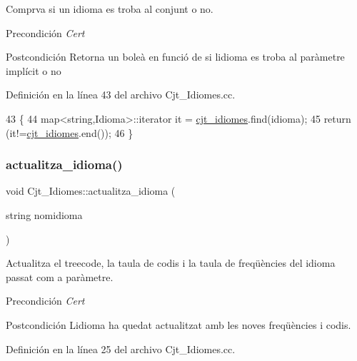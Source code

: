 Comprva si un idioma es troba al conjunt o no. 

\begin{DoxyPrecond}{Precondición}
{\itshape Cert} 
\end{DoxyPrecond}
\begin{DoxyPostcond}{Postcondición}
Retorna un boleà en funció de si l\textquotesingle{}idioma es troba al paràmetre implícit o no 
\end{DoxyPostcond}


Definición en la línea 43 del archivo Cjt\+\_\+\+Idiomes.\+cc.


\begin{DoxyCode}
43                                            \{
44     map<string,Idioma>::iterator it = \hyperlink{class_cjt___idiomes_a1d294e628332477cbb3334cd8fb490a4}{cjt\_idiomes}.find(idioma);
45     \textcolor{keywordflow}{return} (it!=\hyperlink{class_cjt___idiomes_a1d294e628332477cbb3334cd8fb490a4}{cjt\_idiomes}.end());
46 \}
\end{DoxyCode}
\mbox{\label{class_cjt___idiomes_a7aad6974355b73c50c2d5c1edc0a5c14}} 
\subsubsection{\texorpdfstring{actualitza\+\_\+idioma()}{actualitza\_idioma()}}
{\footnotesize\ttfamily void Cjt\+\_\+\+Idiomes\+::actualitza\+\_\+idioma (\begin{DoxyParamCaption}\item[{string}]{nomidioma }\end{DoxyParamCaption})}



Actualitza el treecode, la taula de codis i la taula de freqüències del idioma passat com a paràmetre. 

\begin{DoxyPrecond}{Precondición}
{\itshape Cert} 
\end{DoxyPrecond}
\begin{DoxyPostcond}{Postcondición}
L\textquotesingle{}idioma ha quedat actualitzat amb les noves freqüències i codis. 
\end{DoxyPostcond}


Definición en la línea 25 del archivo Cjt\+\_\+\+Idiomes.\+cc.


